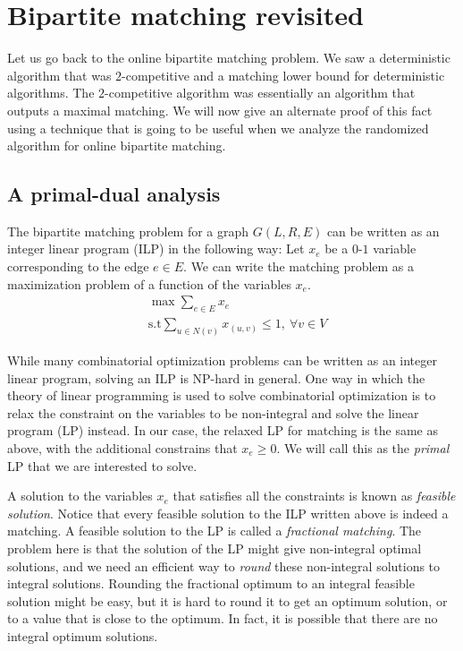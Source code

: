 \section{Bipartite matching revisited}

Let us go back to the online bipartite matching problem. We saw a deterministic
algorithm that was $2$-competitive and a matching lower bound for deterministic
algorithms. The $2$-competitive algorithm was essentially an algorithm that
outputs a maximal matching. We will now give an alternate proof of this fact
using a technique that is going to be useful when we analyze the randomized
algorithm for online bipartite matching.

\subsection{A primal-dual analysis}

The bipartite matching problem for a graph $G(L,R,E)$ can be written as an
integer linear program (ILP) in the following way: Let $x_e$ be a $0$-$1$ variable
corresponding to the edge $e\in E$. We can write the matching problem as a
maximization problem of a function of the variables $x_e$.
\begin{align*}
  & \max  \sum_{e\in E} x_e \\
  & \text{s.t}  \sum_{u\in N(v)} x_{(u,v)} \leq 1, ~\forall v \in V
\end{align*}

While many combinatorial optimization problems can be written as an integer
linear program, solving an ILP is NP-hard in general. One way in which the
theory of linear programming is used to solve combinatorial optimization is to
relax the constraint on the variables to be non-integral and solve the linear
program (LP) instead. In our case, the relaxed LP for matching is the same
as above, with the additional constrains that $x_e \geq 0$. We will call this as
the \emph{primal} LP that we are interested to solve.

A solution to the variables $x_e$ that satisfies all the
constraints is known as \emph{feasible solution}. Notice that every feasible
solution to the ILP written above is indeed a matching. A feasible solution to
the LP is called a \emph{fractional matching}. The problem here is that the
solution of the LP might give non-integral optimal solutions, and we need an
efficient way to \emph{round} these non-integral solutions to integral
solutions.    
Rounding the fractional optimum to an integral feasible solution
might be easy, but it is hard to round it to get an optimum solution, or to a
value that is close to the optimum. In fact, it is possible that there are no
integral optimum solutions. 

